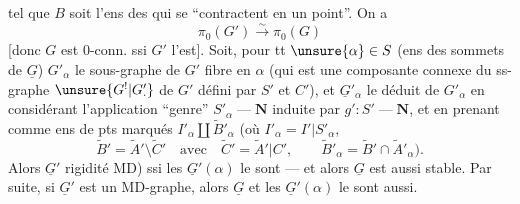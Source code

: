 tel que $B$ soit l'ens des   qui se ``contractent en un point''. On a
\[
\pi_0(G')\overset{\sim}{\longrightarrow}\pi_0(G)
\]
[donc $G$ est $0$-conn. ssi $G'$ l'est].  Soit, pour tt $\unsure{\alpha}\in S$ (ens des sommets de $\underline{G}$) $G'_\alpha$ le sous-graphe de $G'$ fibre en $\alpha$ (qui est une composante connexe du ss-graphe $\unsure{G^!|G'_{\cdot}}$ de $G'$ défini par $S'$ et $C'$), et $\underline{G}'_\alpha$ le  déduit de $G'_\alpha$ en considérant l'application ``genre'' $S'_\alpha\mathbin{\text{---}}\mathbf{N}$ induite par $g':S'\mathbin{\text{---}}\mathbf{N}$, et en prenant comme ens de pts marqués $I'_\alpha\amalg\widetilde{B}'_\alpha$ (où $I'_\alpha=I'|S'_\alpha$,
\[
\widetilde{B}'=\widetilde{A}'\setminus\widetilde{C}'\quad\text{avec}\quad
\widetilde{C}'=\widetilde{A}'|C',\qquad
\widetilde{B}'_\alpha=\widetilde{B}'\cap\widetilde{A}'_\alpha).
\]
Alors $\underline{G}'$   rigidité MD) ssi les $\underline{G}'(\alpha)$ le sont --- et alors $\underline{G}$ est aussi stable. Par suite, si $\underline{G}'$ est un MD-graphe, alors $\underline{G}$ et les $\underline{G}'(\alpha)$ le sont aussi.
